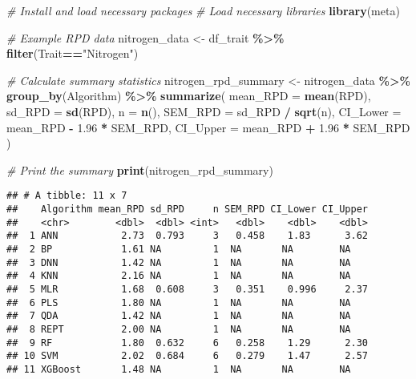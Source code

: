 \documentclass[
]{article}
\newenvironment{Shaded}{\begin{snugshade}}{\end{snugshade}}
\newcommand{\AttributeTok}[1]{\textcolor[rgb]{0.13,0.29,0.53}{#1}}
\newcommand{\CommentTok}[1]{\textcolor[rgb]{0.56,0.35,0.01}{\textit{#1}}}
\newcommand{\FloatTok}[1]{\textcolor[rgb]{0.00,0.00,0.81}{#1}}
\newcommand{\FunctionTok}[1]{\textcolor[rgb]{0.13,0.29,0.53}{\textbf{#1}}}
\newcommand{\NormalTok}[1]{#1}
\newcommand{\OtherTok}[1]{\textcolor[rgb]{0.56,0.35,0.01}{#1}}
\newcommand{\SpecialCharTok}[1]{\textcolor[rgb]{0.81,0.36,0.00}{\textbf{#1}}}
\newcommand{\StringTok}[1]{\textcolor[rgb]{0.31,0.60,0.02}{#1}}
\begin{document}
\begin{Shaded}
\begin{Highlighting}[]
\CommentTok{\# Install and load necessary packages}
\CommentTok{\# Load necessary libraries}
\FunctionTok{library}\NormalTok{(meta)}

\CommentTok{\# Example RPD data}
\NormalTok{nitrogen\_data }\OtherTok{\textless{}{-}}\NormalTok{ df\_trait }\SpecialCharTok{\%\textgreater{}\%} \FunctionTok{filter}\NormalTok{(Trait}\SpecialCharTok{==}\StringTok{"Nitrogen"}\NormalTok{)}

\CommentTok{\# Calculate summary statistics}
\NormalTok{nitrogen\_rpd\_summary }\OtherTok{\textless{}{-}}\NormalTok{ nitrogen\_data }\SpecialCharTok{\%\textgreater{}\%}
  \FunctionTok{group\_by}\NormalTok{(Algorithm) }\SpecialCharTok{\%\textgreater{}\%}
  \FunctionTok{summarize}\NormalTok{(}
    \AttributeTok{mean\_RPD =} \FunctionTok{mean}\NormalTok{(RPD),}
    \AttributeTok{sd\_RPD =} \FunctionTok{sd}\NormalTok{(RPD),}
    \AttributeTok{n =} \FunctionTok{n}\NormalTok{(),}
    \AttributeTok{SEM\_RPD =}\NormalTok{ sd\_RPD }\SpecialCharTok{/} \FunctionTok{sqrt}\NormalTok{(n),}
    \AttributeTok{CI\_Lower =}\NormalTok{ mean\_RPD }\SpecialCharTok{{-}} \FloatTok{1.96} \SpecialCharTok{*}\NormalTok{ SEM\_RPD,}
    \AttributeTok{CI\_Upper =}\NormalTok{ mean\_RPD }\SpecialCharTok{+} \FloatTok{1.96} \SpecialCharTok{*}\NormalTok{ SEM\_RPD}
\NormalTok{  )}

\CommentTok{\# Print the summary}
\FunctionTok{print}\NormalTok{(nitrogen\_rpd\_summary)}
\end{Highlighting}
\end{Shaded}

\begin{verbatim}
## # A tibble: 11 x 7
##    Algorithm mean_RPD sd_RPD     n SEM_RPD CI_Lower CI_Upper
##    <chr>        <dbl>  <dbl> <int>   <dbl>    <dbl>    <dbl>
##  1 ANN           2.73  0.793     3   0.458    1.83      3.62
##  2 BP            1.61 NA         1  NA       NA        NA   
##  3 DNN           1.42 NA         1  NA       NA        NA   
##  4 KNN           2.16 NA         1  NA       NA        NA   
##  5 MLR           1.68  0.608     3   0.351    0.996     2.37
##  6 PLS           1.80 NA         1  NA       NA        NA   
##  7 QDA           1.42 NA         1  NA       NA        NA   
##  8 REPT          2.00 NA         1  NA       NA        NA   
##  9 RF            1.80  0.632     6   0.258    1.29      2.30
## 10 SVM           2.02  0.684     6   0.279    1.47      2.57
## 11 XGBoost       1.48 NA         1  NA       NA        NA
\end{verbatim}
\end{document}
